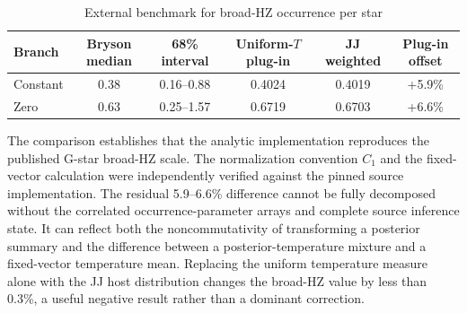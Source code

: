 \begin{table}[t]
\caption{External benchmark for broad-HZ occurrence per star}
\label{tab:external_benchmark}
\centering
\small
\setlength{\tabcolsep}{6pt}
\begin{tabular}{lccccc}
\toprule
Branch & Bryson median & 68\% interval & Uniform-$T$ plug-in & JJ weighted & Plug-in offset\\
\midrule
Constant & 0.38 & 0.16--0.88 & 0.4024 & 0.4019 & +5.9\%\\
Zero & 0.63 & 0.25--1.57 & 0.6719 & 0.6703 & +6.6\%\\
\bottomrule
\end{tabular}
\end{table}

The comparison establishes that the analytic implementation reproduces the published G-star broad-HZ scale. The normalization convention $C_1$ and the fixed-vector calculation were independently verified against the pinned source implementation. The residual 5.9--6.6\% difference cannot be fully decomposed without the correlated occurrence-parameter arrays and complete source inference state. It can reflect both the noncommutativity of transforming a posterior summary and the difference between a posterior-temperature mixture and a fixed-vector temperature mean. Replacing the uniform temperature measure alone with the JJ host distribution changes the broad-HZ value by less than 0.3\%, a useful negative result rather than a dominant correction.
